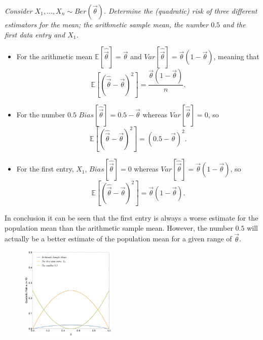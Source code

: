 \begin{example}
	\emph{Consider $X_1,\dots, X_n\sim Ber(\vec{\theta})$. Determine the (quadratic) risk of three different estimators for the mean; the arithmetic sample mean, the number $0.5$ and the first data entry and $X_1$.}\newline
	
	\begin{itemize}
		\item For the arithmetic mean $\mathbb{E}[\hat{\vec{\theta}}]=\vec{\theta}$ and $Var[\hat{\vec{\theta}}]=\vec{\theta}(1-\vec{\theta})$, meaning that
		\begin{equation}
			\mathbb{E}[(\hat{\vec{\theta}}-\vec{\theta})^2]=\frac{\vec{\theta}(1-\vec{\theta})}{n}.
		\end{equation}
		
		\item For the number $0.5$ $Bias[\hat{\vec{\theta}}]=0.5-\vec{\theta}$ whereas $Var[\hat{\vec{\theta}}]=0$, so
		\begin{equation}
			\mathbb{E}[(\hat{\vec{\theta}}-\vec{\theta})^2]=(0.5-\vec{\theta})^2.
		\end{equation}
		
		\item For the first entry, $X_1$, $Bias[\hat{\vec{\theta}}]=0$ whereas $Var[\hat{\vec{\theta}}]=\vec{\theta}(1-\vec{\theta})$, so
		\begin{equation}
			\mathbb{E}[(\hat{\vec{\theta}}-\vec{\theta})^2]=\vec{\theta}(1-\vec{\theta}).
		\end{equation}
	\end{itemize}
	In conclusion it can be seen that the first entry is always a worse estimate for the population mean than the arithmetic sample mean. However, the number $0.5$ will actually be a better estimate of the population mean for a given range of $\vec{\theta}$.  
	\begin{figure}[H]
		\captionsetup{width=1\textwidth}
		\centering
		\includegraphics[width=0.4\textwidth]{figures/P1.pdf}
		\caption{}
		\label{fig:pen}
	\end{figure}
	
\end{example}


